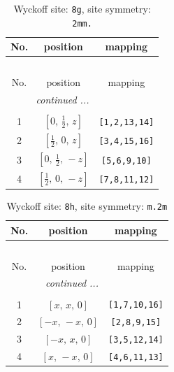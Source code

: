 \documentclass[fleqn,8pt]{jsarticle}
\begin{document}
\begin{longtable}{ccc}
\caption{Wyckoff site: {\tt 8g}, site symmetry: {\tt 2mm.}}
 \\
 \hline \hline
No. & position & mapping \\ \hline \endfirsthead

\multicolumn{2}{l}{\tablename\ \thetable{}} \\
 \hline \hline
No. & position & mapping \\ \hline \endhead

 \hline \hline
\multicolumn{2}{r}{\footnotesize\it continued ...} \\ \endfoot

 \hline \hline
\multicolumn{2}{r}{} \\ \endlastfoot

1 & $\left[ 0,\, \frac{1}{2},\, z \right]$ & {\tt [1,2,13,14]} \\ \hline
2 & $\left[ \frac{1}{2},\, 0,\, z \right]$ & {\tt [3,4,15,16]} \\ \hline
3 & $\left[ 0,\, \frac{1}{2},\, - z \right]$ & {\tt [5,6,9,10]} \\ \hline
4 & $\left[ \frac{1}{2},\, 0,\, - z \right]$ & {\tt [7,8,11,12]} \\
\end{longtable}
\renewcommand{\arraystretch}{1.2}
\begin{longtable}{ccc}
\caption{Wyckoff site: {\tt 8h}, site symmetry: {\tt m.2m}}
 \\
 \hline \hline
No. & position & mapping \\ \hline \endfirsthead

\multicolumn{2}{l}{\tablename\ \thetable{}} \\
 \hline \hline
No. & position & mapping \\ \hline \endhead

 \hline \hline
\multicolumn{2}{r}{\footnotesize\it continued ...} \\ \endfoot

 \hline \hline
\multicolumn{2}{r}{} \\ \endlastfoot

1 & $\left[ x,\, x,\, 0 \right]$ & {\tt [1,7,10,16]} \\ \hline
2 & $\left[ - x,\, - x,\, 0 \right]$ & {\tt [2,8,9,15]} \\ \hline
3 & $\left[ - x,\, x,\, 0 \right]$ & {\tt [3,5,12,14]} \\ \hline
4 & $\left[ x,\, - x,\, 0 \right]$ & {\tt [4,6,11,13]} \\
\end{longtable}
\end{document}
